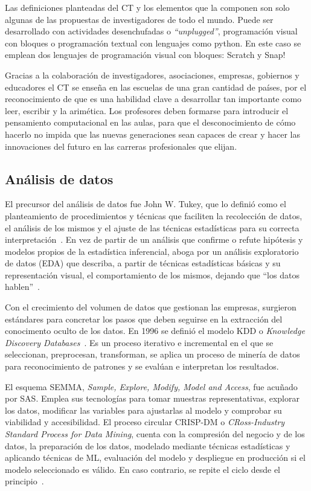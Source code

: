 \documentclass[a4paper, 12pt]{book}
\begin{document}
Las definiciones planteadas del CT y los elementos que la componen son solo algunas de las propuestas de investigadores de todo el mundo. Puede ser desarrollado con actividades desenchufadas o \emph{``unplugged''}, programación visual con bloques o programación textual con lenguajes como python. En este caso se emplean dos lenguajes de programación visual con bloques: Scratch y Snap!

Gracias a la colaboración de investigadores, asociaciones, empresas, gobiernos y educadores el CT se enseña en las escuelas de una gran cantidad de países, por el reconocimiento de que es una habilidad clave a desarrollar tan importante como leer, escribir y la arimética. Los profesores deben formarse para introducir el pensamiento computacional en las aulas, para que el desconocimiento de cómo hacerlo no  impida que las nuevas generaciones sean capaces de crear y hacer las innovaciones del futuro en las carreras profesionales que elijan.

\subsection{Análisis de datos}
\label{subsec:analisis_datos}

El precursor del análisis de datos fue John W. Tukey, que lo definió como el planteamiento de procedimientos y técnicas que faciliten la recolección de datos, el análisis de los mismos y el ajuste de las técnicas estadísticas para su correcta interpretación~\cite{tukey1962future}. En vez de partir de un análisis que confirme o refute hipótesis y modelos propios de la estadística inferencial, aboga por un análisis exploratorio de datos (EDA) que describa, a partir de técnicas estadísticas básicas y su representación visual, el comportamiento de los mismos, dejando que ``los datos hablen''~\cite{tukey1977Eda}.

Con el crecimiento del volumen de datos que gestionan las empresas, surgieron estándares para concretar los pasos que deben seguirse en la extracción del conocimento oculto de los datos. En 1996 se definió el modelo KDD o \emph{Knowledge Discovery Databases}~\cite{fayyad1996kdd}. Es un proceso iterativo e incremental en el que se seleccionan, preprocesan, transforman, se aplica un proceso de minería de datos para reconocimiento de patrones y se evalúan e interpretan los resultados.

El esquema SEMMA, \emph{Sample, Explore, Modify, Model and Access}, fue acuñado por SAS. Emplea sus tecnologías para tomar muestras representativas, explorar los datos, modificar las variables para ajustarlas al modelo y comprobar su viabilidad y accesibilidad. El proceso circular CRISP-DM o \emph{CRoss-Industry Standard Process for Data Mining}, cuenta con la compresión del negocio y de los datos, la preparación de los datos, modelado mediante técnicas estadísticas y aplicando técnicas de ML, evaluación del modelo y despliegue en producción si el modelo seleccionado es válido. En caso contrario, se repite el ciclo desde el principio~\cite{azevedo2008kdd, navlani2021python}.
\end{document}
